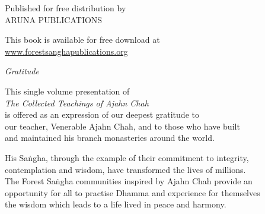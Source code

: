 
\mbox{}\thispagestyle{empty}\newpage
\mbox{}\thispagestyle{empty}\newpage

{\pagestyle{empty}\Large%

\mbox{}\label{aj-chah-portrait}


\mbox{}

\cleardoublepage

{\raggedleft\setlength{\parskip}{0.75em}\setlength{\parindent}{0em}

\vspace*{3\baselineskip}
{\selectfont\Large \bookTitle}

\vfill

{\Small

Published for free distribution by\\
ARUNA PUBLICATIONS

This book is available for free download at\\
\href{http://www.forestsanghapublications.org/}{www.forestsanghapublications.org}

}

}



\newpage

\vspace*{-2\baselineskip}

{\centering\mbox{}\vspace*{\chaptopskip}

\begin{minipage}{0.9\linewidth}\Small\centering\setlength{\parskip}{1em}\setlength{\parindent}{0em}

{\tenandtwelvesize\textit{Gratitude}}
\vspace*{\baselineskip}

This single volume presentation of\\ \textit{The Collected Teachings of Ajahn Chah}\\ is offered as an expression of our deepest gratitude to\\ our teacher, Venerable Ajahn Chah, and to those who have built\\ and maintained his branch monasteries around the world. 

His Sa\.ngha, through the example of their commitment to integrity,\\ contemplation and wisdom, have transformed the lives of millions.\\ The Forest Sa\.ngha communities inspired by Ajahn Chah provide an\\ opportunity for all to practise Dhamma and experience for themselves\\ the wisdom which leads to a life lived in peace and harmony.


\end{minipage}}}
